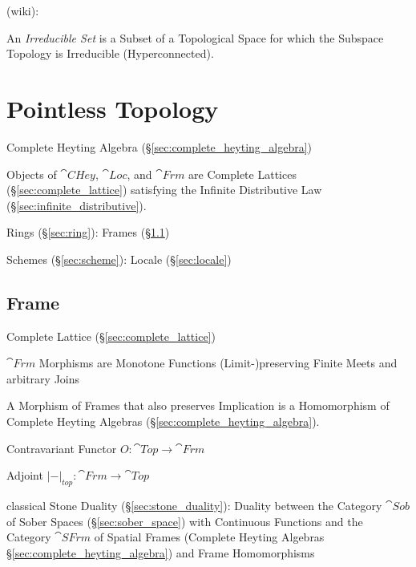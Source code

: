 (wiki):

An \emph{Irreducible Set} is a Subset of a Topological Space for which the
Subspace Topology is Irreducible (Hyperconnected).



\section{Pointless Topology}\label{sec:pointless_topology}

Complete Heyting Algebra (\S\ref{sec:complete_heyting_algebra})

Objects of $\cat{CHey}$, $\cat{Loc}$, and $\cat{Frm}$ are Complete
Lattices (\S\ref{sec:complete_lattice}) satisfying the Infinite
Distributive Law (\S\ref{sec:infinite_distributive}).

Rings (\S\ref{sec:ring}): Frames (\S\ref{sec:frame})

Schemes (\S\ref{sec:scheme}): Locale (\S\ref{sec:locale})



\subsection{Frame}\label{sec:frame}

Complete Lattice (\S\ref{sec:complete_lattice})

$\cat{Frm}$ Morphisms are Monotone Functions (Limit-)preserving Finite
Meets and arbitrary Joins

A Morphism of Frames that also preserves Implication is a Homomorphism
of Complete Heyting Algebras (\S\ref{sec:complete_heyting_algebra}).

Contravariant Functor $O : \cat{Top} \rightarrow \cat{Frm}$

Adjoint $|-|_{top} : \cat{Frm} \rightarrow \cat{Top}$ %

classical Stone Duality (\S\ref{sec:stone_duality}): Duality between the
Category $\cat{Sob}$ of Sober Spaces (\S\ref{sec:sober_space}) with Continuous
Functions and the Category $\cat{SFrm}$ of Spatial Frames (Complete Heyting
Algebras \S\ref{sec:complete_heyting_algebra}) and Frame Homomorphisms



